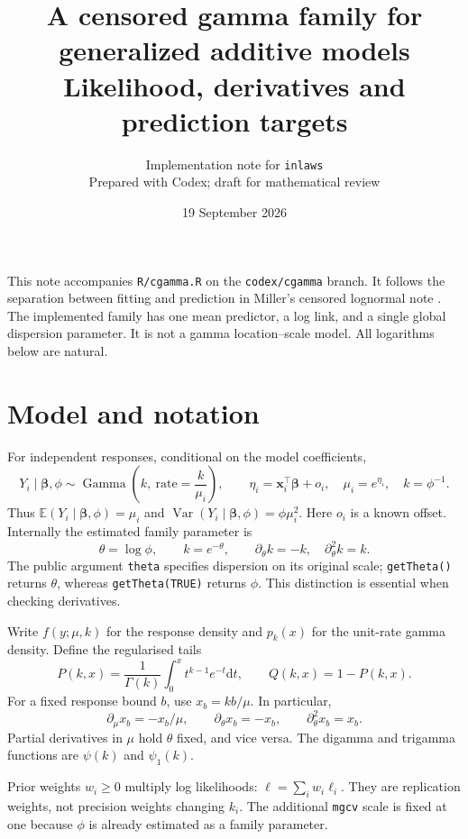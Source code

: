 \documentclass[11pt,a4paper]{article}
\title{A censored gamma family for generalized additive models\\[5pt]
\large Likelihood, derivatives and prediction targets}
\author{Implementation note for \texttt{inlaws}\\
\small Prepared with Codex; draft for mathematical review}
\date{19 September 2026}
\newcommand{\E}{\mathbb{E}}
\newcommand{\Var}{\operatorname{Var}}
\newcommand{\dd}{\mathrm{d}}
\newcommand{\code}[1]{\texttt{#1}}
\begin{document}
\maketitle
\thispagestyle{plain}

This note accompanies \code{R/cgamma.R} on the \code{codex/cgamma} branch.
It follows the separation between fitting and prediction in Miller's censored
lognormal note \cite{miller}. The implemented family has one mean predictor,
a log link, and a single global dispersion parameter. It is not a gamma
location--scale model. All logarithms below are natural.

\section{Model and notation}
For independent responses, conditional on the model coefficients,
\begin{equation}
 Y_i\mid\bm\beta,\phi\sim\operatorname{Gamma}
 \left(k,\ \text{rate}=\frac{k}{\mu_i}\right),\qquad
 \eta_i=\bm x_i^\top\bm\beta+o_i,\quad \mu_i=e^{\eta_i},\quad k=\phi^{-1}.
 \label{eq:model}
\end{equation}
Thus $\E(Y_i\mid\bm\beta,\phi)=\mu_i$ and
$\Var(Y_i\mid\bm\beta,\phi)=\phi\mu_i^2$. Here $o_i$ is a known offset.
Internally the estimated family parameter is
\begin{equation}
 \theta=\log\phi,\qquad k=e^{-\theta},\qquad
 \partial_\theta k=-k,\quad \partial_\theta^2 k=k.
 \label{eq:theta}
\end{equation}
The public argument \code{theta} specifies dispersion on its original scale;
\code{getTheta()} returns $\theta$, whereas \code{getTheta(TRUE)} returns $\phi$.
This distinction is essential when checking derivatives.

Write $f(y;\mu,k)$ for the response density and $p_k(x)$ for the unit-rate gamma
density. Define the regularised tails
\[
 P(k,x)=\frac{1}{\Gamma(k)}\int_0^x t^{k-1}e^{-t}\dd t,
 \qquad Q(k,x)=1-P(k,x).
\]
For a fixed response bound $b$, use $x_b=kb/\mu$. In particular,
\[
 \partial_\mu x_b=-x_b/\mu,\qquad
 \partial_\theta x_b=-x_b,\qquad \partial_\theta^2x_b=x_b.
\]
Partial derivatives in $\mu$ hold $\theta$ fixed, and vice versa. The digamma
and trigamma functions are $\psi(k)$ and $\psi_1(k)$.

Prior weights $w_i\geq0$ multiply log likelihoods: $\ell=\sum_iw_i\ell_i$.
They are replication weights, not precision weights changing $k_i$.
The additional \code{mgcv} scale is fixed at one because $\phi$ is already
estimated as a family parameter.
\end{document}
